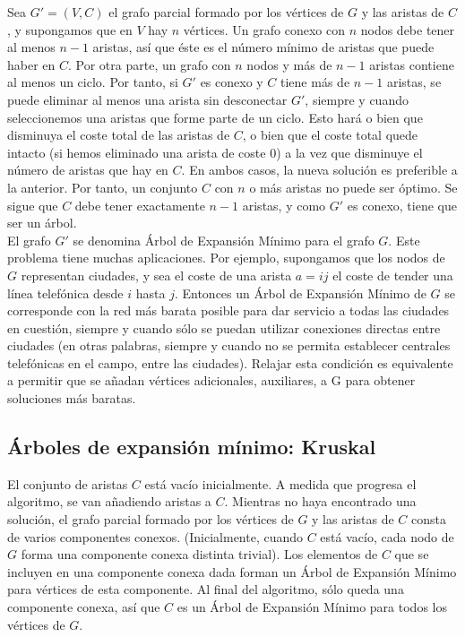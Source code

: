 Sea $G' = (V,C)$ el grafo parcial formado por los vértices de $G$ y las aristas de $C$, y supongamos que en $V$ hay $n$ vértices. Un grafo conexo con $n$ nodos debe tener al menos $n-1$ aristas, así que éste es el número mínimo de aristas que puede haber en $C$. Por otra parte, un grafo con $n$ nodos y más de $n-1$ aristas contiene al menos un ciclo. Por tanto, si $G'$ es conexo y $C$ tiene más de $n-1$ aristas, se puede eliminar al menos una arista sin desconectar $G'$, siempre y cuando seleccionemos una aristas que forme parte de un ciclo. Esto hará o bien que disminuya el coste total de las aristas de $C$, o bien que el coste total quede intacto (si hemos eliminado una arista de coste 0) a la vez que disminuye el número de aristas que hay en $C$. En ambos casos, la nueva solución es preferible a la anterior. Por tanto, un conjunto $C$ con $n$ o más aristas no puede ser óptimo. Se sigue que $C$ debe tener exactamente $n-1$ aristas, y como $G'$ es conexo, tiene que ser un árbol.\\

El grafo $G'$ se denomina Árbol de Expansión Mínimo para el grafo $G$. Este problema tiene muchas aplicaciones. Por ejemplo, supongamos que los nodos de $G$ representan ciudades, y sea el coste de una arista $a = ij$ el coste de tender una línea telefónica desde $i$ hasta $j$. Entonces un Árbol de Expansión Mínimo de $G$ se corresponde con la red más barata posible para dar servicio a todas las ciudades en cuestión, siempre y cuando sólo se puedan utilizar conexiones directas entre ciudades (en otras palabras, siempre y cuando no se permita establecer centrales telefónicas en el campo, entre las ciudades). Relajar esta condición es equivalente a permitir que se añadan vértices adicionales, auxiliares, a G para obtener soluciones más baratas.\\

\subsection{Árboles de expansión mínimo: Kruskal}

El conjunto de aristas $C$ está vacío inicialmente. A medida que progresa el algoritmo, se van añadiendo aristas a $C$. Mientras no haya encontrado una solución, el grafo parcial formado por los vértices de $G$ y las aristas de $C$ consta de varios componentes conexos. (Inicialmente, cuando $C$ está vacío, cada nodo de $G$ forma una componente conexa distinta trivial). Los elementos de $C$ que se incluyen en una componente conexa dada forman un Árbol de Expansión Mínimo para vértices de esta componente. Al final del algoritmo, sólo queda una componente conexa, así que $C$ es un Árbol de Expansión Mínimo para todos los vértices de $G$.\\

